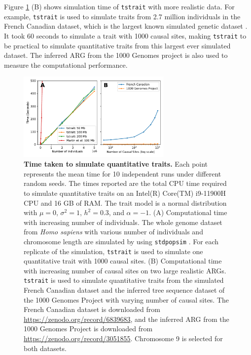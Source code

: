 \documentclass[unnumsec,webpdf,modern,large,namedate]{oup-authoring-template}%
\begin{document}
Figure \ref{fig:time} (B) shows simulation time of \texttt{tstrait} with more
realistic data. For example, \texttt{tstrait} is used to simulate traits from
2.7 million individuals in the French Canadian dataset, which is the largest
known simulated genetic dataset \citep{anderson2023}. It took 60 seconds to
simulate a trait with 1000 causal sites, making \texttt{tstrait} to be
practical to simulate quantitative traits from this largest ever simulated
dataset. The inferred ARG from the 1000 Genomes project \citep{kelleher2019} is
also used to measure the computational performance.

\begin{figure}[!t]%
\centering
\includegraphics[width=213pt]{figures/time-scaling.pdf}
\caption{\textbf{Time taken to simulate quantitative traits.} Each point
represents the mean time for 10 independent runs under different random seeds.
The times reported are the total CPU time required to simulate quantitative
traits on an Intel(R) Core(TM) i9-11900H CPU and 16 GB of RAM. The trait model
is a normal distribution with $\mu=0$, $\sigma^2=1$, $h^2=0.3$, and
$\alpha=-1$. (A) Computational time with increasing number of individuals. The
whole genome dataset from \emph{Homo sapiens} with various number of
individuals and chromosome length are simulated by using \texttt{stdpopsim}
\citep{adrion2020}. For each replicate of the simulation, \texttt{tstrait} is
used to simulate one quantitative trait with 1000 causal sites. (B)
Computational time with increasing number of causal sites on two large
realistic ARGs. \texttt{tstrait} is used to simulate quantitative traits from
the simulated French Canadian dataset \citep{anderson2023} and the inferred
tree sequence dataset of the 1000 Genomes Project \citep{kelleher2019} with
varying number of causal sites. The French Canadian dataset is downloaded from
\url{https://zenodo.org/record/6839683}, and the inferred ARG from the 1000
Genomes Project is downloaded from \url{https://zenodo.org/record/3051855}.
Chromosome 9 is selected for both datasets.}\label{fig:time}
\end{figure}
\end{document}
